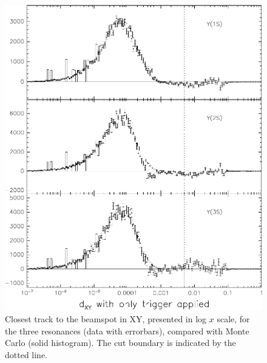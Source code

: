 \begin{figure}
  \includegraphics[width=\linewidth]{plots/efficiency_dxy}
  \caption{\label{efficiency_dxy} Closest track to the beamspot in XY,
    presented in log $x$ scale, for the three resonances (data with
    errorbars), compared with Monte Carlo (solid histogram).  The cut
    boundary is indicated by the dotted line.}
\end{figure}

